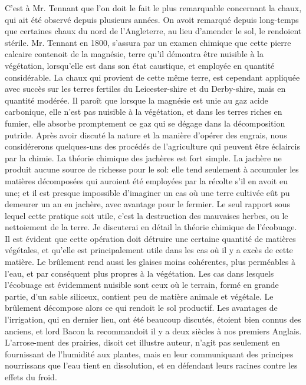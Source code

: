C'est à Mr. Tennant que l'on doit le fait le plus remarquable concernant la chaux, qui ait été observé depuis plusieurs années. On avoit remarqué depuis long-temps que certaines chaux du nord de l'Angleterre, au lieu d'amender le sol, le rendoient stérile. Mr. Tennant en 1800, s'assura par un examen chimique que cette pierre calcaire contenoit de la magnésie, terre qu'il démontra être nuisible à la végétation, lorsqu'elle est dans son état caustique, et employée en quantité considérable. La chaux qui provient de cette même terre, est cependant appliquée avec succès sur les terres fertiles du Leicester-shire et du Derby-shire, mais en quantité modérée. Il paroît que lorsque la magnésie est unie au gaz acide carbonique, elle n'est pas nuisible à la végétation, et dans les terres riches en fumier, elle absorbe promptement ce gaz qui se dégage dans la décomposition putride.\setcounter{page}{351} Après avoir discuté la nature et la manière d'opérer des engrais, nous considérerons quelques-uns des procédés de l'agriculture qui peuvent être éclaircis par la chimie.
La théorie chimique des jachères est fort simple. La jachère ne produit aucune source de richesse pour le sol: elle tend seulement à accumuler les matières décomposées qui auroient été employées par la récolte s'il en avoit eu une; et il est presque impossible d'imaginer un cas où une terre cultivée eût pu demeurer un an en jachère, avec avantage pour le fermier. Le seul rapport sous lequel cette pratique soit utile, c'est la destruction des mauvaises herbes, ou le nettoiement de la terre.
Je discuterai en détail la théorie chimique de l'écobuage. Il est évident que cette opération doit détruire une certaine quantité de matières végétales, et qu'elle est principalement utile dans les cas où il y a excès de cette matière. Le brûlement rend aussi les glaises moins cohérentes, plus perméables à l'eau, et par conséquent plus propres à la végétation.
Les cas dans lesquels l'écobuage est évidemment nuisible sont ceux où le terrain, formé en grande partie, d'un sable siliceux, contient peu de matière animale et végétale.\setcounter{page}{352} Le brûlement décompose alors ce qui rendoit le sol productif.
Les avantages de l'irrigation, qui en dernier lieu, ont été beaucoup discutés, étoient bien connus des anciens, et lord Bacon la recommandoit il y a deux siècles à nos premiers Anglais. L'arrose-ment des prairies, disoit cet illustre auteur, n'agit pas seulement en fournissant de l'humidité aux plantes, mais en leur communiquant des principes nourrissans que l'eau tient en dissolution, et en défendant leurs racines contre les effets du froid.
